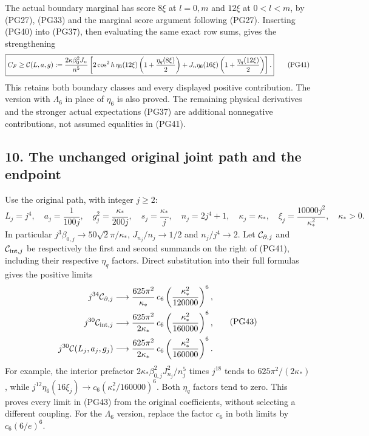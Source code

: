 \documentclass[11pt]{article}
\begin{document}
The actual boundary marginal has score \(8\xi\) at \(l=0,m\)
and \(12\xi\) at \(0<l<m\), by (PG27), (PG33) and the marginal
score argument following (PG27). Inserting (PG40) into (PG37),
then evaluating the same exact row sums, gives the strengthening
\[
 \boxed{\displaystyle
 C_F\ge {\cal C}(L,a,g):=
 \frac{2\kappa\beta_0^2J_n}{n^5}
 \left[
 2\cos^2h\,\eta_6(12\xi)\left(1+\frac{\eta_q(8\xi)}2\right)
 +J_n\eta_6(16\xi)\left(1+\frac{\eta_q(12\xi)}2\right)
 \right].}
 \tag{PG41}
\]
This retains both boundary classes and every displayed positive
contribution. The version with \(\Lambda_6\) in place of \(\eta_6\)
is also proved. The remaining physical derivatives and the stronger
actual expectations (PG37) are additional nonnegative contributions,
not assumed equalities in (PG41).

\subsection*{10. The unchanged original joint path and the endpoint}

Use the original path, with integer \(j\ge2\):
\[
 L_j=j^4,\quad a_j=\frac1{100j},\quad
 g_j^2=\frac{\kappa_*}{200j},\quad s_j=\frac{\kappa_*}{j},\quad
 n_j=2j^4+1,\quad
 \kappa_j=\kappa_*,\quad \xi_j=\frac{10000j^2}{\kappa_*^2},
 \quad\kappa_*>0.
 \tag{PG42}
\]
In particular
\(j^3\beta_{0,j}\to50\sqrt2\pi/\kappa_*\),
\(J_{n_j}/n_j\to1/2\) and \(n_j/j^4\to2\).
Let \({\cal C}_{\partial,j}\) and \({\cal C}_{{\rm int},j}\)
be respectively the first and second summands on the right of
(PG41), including their respective \(\eta_q\) factors. Direct
substitution into their full formulas gives the positive limits
\[
 \begin{aligned}
 j^{34}{\cal C}_{\partial,j}
 &\longrightarrow
 \frac{625\pi^2}{\kappa_*}\,c_6
               \left(\frac{\kappa_*^2}{120000}\right)^6,\\
 j^{30}{\cal C}_{{\rm int},j}
 &\longrightarrow
 \frac{625\pi^2}{2\kappa_*}\,c_6
               \left(\frac{\kappa_*^2}{160000}\right)^6,\\
 j^{30}{\cal C}(L_j,a_j,g_j)
 &\longrightarrow
 \frac{625\pi^2}{2\kappa_*}\,c_6
               \left(\frac{\kappa_*^2}{160000}\right)^6.
 \end{aligned}\tag{PG43}
\]
For example, the interior prefactor
\(2\kappa_*\beta_{0,j}^2J_{n_j}^2/n_j^5\) times \(j^{18}\)
tends to \(625\pi^2/(2\kappa_*)\), while
\(j^{12}\eta_6(16\xi_j)\to
c_6(\kappa_*^2/160000)^6\).
Both \(\eta_q\) factors tend to zero. This proves every limit
in (PG43) from the original coefficients, without selecting a
different coupling. For the \(\Lambda_6\) version, replace the
factor \(c_6\) in both limits by \(c_6(6/e)^6\).
\end{document}

